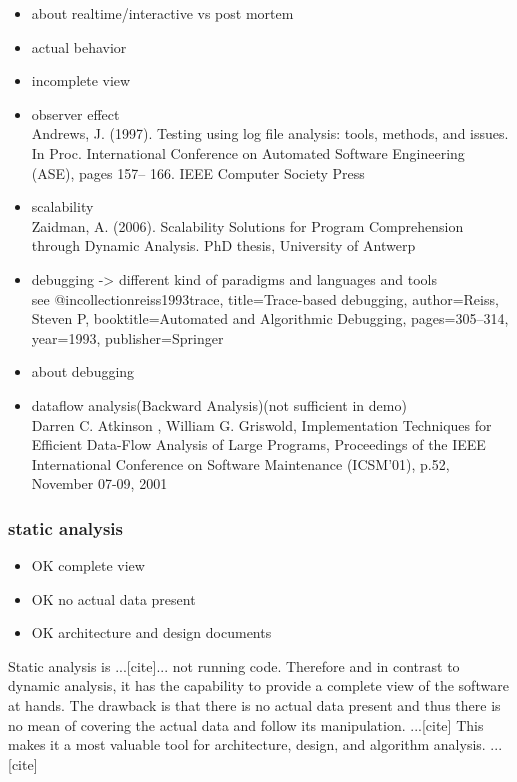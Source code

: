 \begin{itemize}
\begin{itemize}
\item about realtime/interactive vs post mortem
\item actual behavior
\item incomplete view \cite{Ball:1999:CDA:318774.318944}
\item observer effect \\
Andrews, J. (1997). Testing using log file analysis: tools, methods, and issues.
In Proc. International Conference on Automated Software Engineering (ASE), pages 157–
166. IEEE Computer Society Press
\item scalability \\
Zaidman, A. (2006). Scalability Solutions for Program Comprehension through Dynamic
Analysis. PhD thesis, University of Antwerp
\item debugging -> different kind of paradigms and languages and tools\\
see @incollection{reiss1993trace,
title={Trace-based debugging},
author={Reiss, Steven P},
booktitle={Automated and Algorithmic Debugging},
pages={305--314},
year={1993},
publisher={Springer}
}
\item about debugging
\item dataflow analysis(Backward Analysis)(not sufficient in demo) \\
	Darren C. Atkinson , William G. Griswold, Implementation Techniques for Efficient Data-Flow Analysis of Large Programs, Proceedings of the IEEE International Conference on Software Maintenance (ICSM'01), p.52, November 07-09, 2001
\end{itemize}

\subsubsection{static analysis}

\begin{itemize}
\item OK complete view
\item OK no actual data present
\item OK architecture and design documents
\end{itemize}

Static analysis is ...[cite]... not running code.
Therefore and in contrast to dynamic analysis, it has the capability to provide a complete view of the software at hands. The drawback is that there is no actual data present and thus there is no mean of covering the actual data and follow its manipulation. ...[cite]
This makes it a most valuable tool for architecture, design, and algorithm analysis. ...[cite]


\end{itemize}
